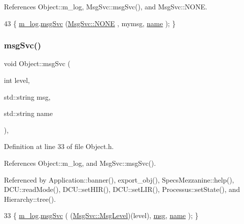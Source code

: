 References Object\+::m\+\_\+log, Msg\+Svc\+::msg\+Svc(), and Msg\+Svc\+::\+N\+O\+NE.


\begin{DoxyCode}
43 \{ \hyperlink{classObject_a0d269813dd7ac1f24bc143031e2963f2}{m\_log}.\hyperlink{classMsgSvc_ad25f18047920cc59a314e5098259711c}{msgSvc} (\hyperlink{classMsgSvc_ae671eb7301996cd049d2da8a65925926a9be9ae32fed8e1e6eba4a58692210fbd}{MsgSvc::NONE}    , mymsg, \hyperlink{classObject_a300f4c05dd468c7bb8b3c968868443c1}{name} ); \}
\end{DoxyCode}
\mbox{\label{classObject_a3f9d5537ebce0c0f2bf6ae4d92426f3c}} 
\subsubsection{\texorpdfstring{msg\+Svc()}{msgSvc()}}
{\footnotesize\ttfamily void Object\+::msg\+Svc (\begin{DoxyParamCaption}\item[{int}]{level,  }\item[{std\+::string}]{msg,  }\item[{std\+::string}]{name }\end{DoxyParamCaption})\hspace{0.3cm}{\ttfamily [inline]}, {\ttfamily [inherited]}}



Definition at line 33 of file Object.\+h.



References Object\+::m\+\_\+log, and Msg\+Svc\+::msg\+Svc().



Referenced by Application\+::banner(), export\+\_\+obj(), Specs\+Mezzanine\+::help(), D\+C\+U\+::read\+Mode(), D\+C\+U\+::set\+H\+I\+R(), D\+C\+U\+::set\+L\+I\+R(), Processus\+::set\+State(), and Hierarchy\+::tree().


\begin{DoxyCode}
33 \{ \hyperlink{classObject_a0d269813dd7ac1f24bc143031e2963f2}{m\_log}.\hyperlink{classMsgSvc_ad25f18047920cc59a314e5098259711c}{msgSvc} ( (\hyperlink{classMsgSvc_ae671eb7301996cd049d2da8a65925926}{MsgSvc::MsgLevel})(level), \hyperlink{classObject_a58b2d0618c2d08cf2383012611528d97}{msg}, 
      \hyperlink{classObject_a300f4c05dd468c7bb8b3c968868443c1}{name} ); \}
\end{DoxyCode}
\mbox{\label{classObject_a300f4c05dd468c7bb8b3c968868443c1}} 
